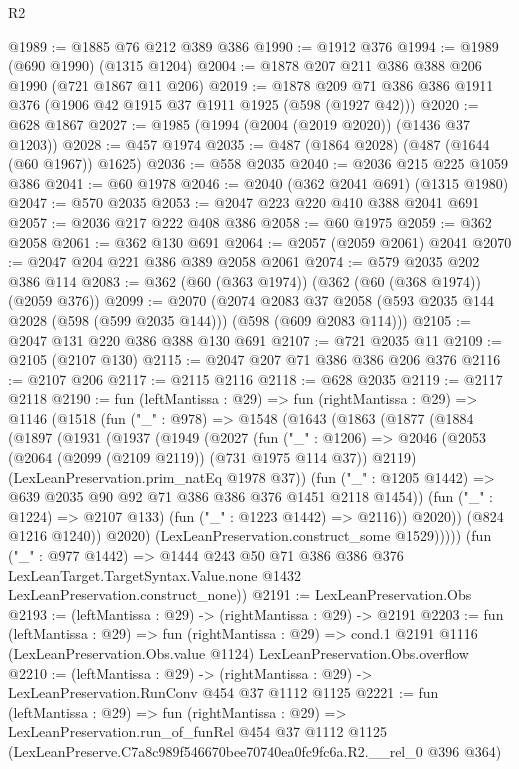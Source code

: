 \begin{lexlean}{R2}
\begin{coremodule}
@1989 := @1885 @76 @212 @389 @386
@1990 := @1912 @376
@1994 := @1989 (@690 @1990) (@1315 @1204)
@2004 := @1878 @207 @211 @386 @388 @206 @1990 (@721 @1867 @11 @206)
@2019 := @1878 @209 @71 @386 @386 @1911 @376 (@1906 @42 @1915 @37 @1911 @1925 (@598 (@1927 @42)))
@2020 := @628 @1867
@2027 := @1985 (@1994 (@2004 (@2019 @2020)) (@1436 @37 @1203))
@2028 := @457 @1974
@2035 := @487 (@1864 @2028) (@487 (@1644 (@60 @1967)) @1625)
@2036 := @558 @2035
@2040 := @2036 @215 @225 @1059 @386
@2041 := @60 @1978
@2046 := @2040 (@362 @2041 @691) (@1315 @1980)
@2047 := @570 @2035
@2053 := @2047 @223 @220 @410 @388 @2041 @691
@2057 := @2036 @217 @222 @408 @386
@2058 := @60 @1975
@2059 := @362 @2058
@2061 := @362 @130 @691
@2064 := @2057 (@2059 @2061) @2041
@2070 := @2047 @204 @221 @386 @389 @2058 @2061
@2074 := @579 @2035 @202 @386 @114
@2083 := @362 (@60 (@363 @1974)) (@362 (@60 (@368 @1974)) (@2059 @376))
@2099 := @2070
    (@2074
      @2083
      @37
      @2058
      (@593 @2035 @144 @2028 (@598 (@599 @2035 @144)))
      (@598 (@609 @2083 @114)))
@2105 := @2047 @131 @220 @386 @388 @130 @691
@2107 := @721 @2035 @11
@2109 := @2105 (@2107 @130)
@2115 := @2047 @207 @71 @386 @386 @206 @376
@2116 := @2107 @206
@2117 := @2115 @2116
@2118 := @628 @2035
@2119 := @2117 @2118
@2190 := fun (leftMantissa : @29) =>
  fun (rightMantissa : @29) =>
  @1146
    (@1518
      (fun ("_" : @978) =>
      @1548
        (@1643
          (@1863
            (@1877
              (@1884
                (@1897
                  (@1931
                    (@1937
                      (@1949
                        (@2027
                          (fun ("_" : @1206) =>
                          @2046
                            (@2053 (@2064 (@2099 (@2109 @2119)) (@731 @1975 @114 @37)) @2119)
                            (LexLeanPreservation.prim_natEq @1978 @37))
                          (fun ("_" : @1205 @1442) =>
                          @639 @2035 @90 @92 @71 @386 @386 @376 @1451 @2118 @1454))
                        (fun ("_" : @1224) => @2107 @133)
                        (fun ("_" : @1223 @1442) => @2116))
                      @2020))
                  (@824 @1216 @1240))
                @2020)
              (LexLeanPreservation.construct_some @1529)))))
      (fun ("_" : @977 @1442) =>
      @1444
        @243
        @50
        @71
        @386
        @386
        @376
        LexLeanTarget.TargetSyntax.Value.none
        @1432
        LexLeanPreservation.construct_none))
@2191 := LexLeanPreservation.Obs
@2193 := (leftMantissa : @29) -> (rightMantissa : @29) -> @2191
@2203 := fun (leftMantissa : @29) =>
  fun (rightMantissa : @29) =>
  cond.{1} @2191 @1116 (LexLeanPreservation.Obs.value @1124) LexLeanPreservation.Obs.overflow
@2210 := (leftMantissa : @29) ->
  (rightMantissa : @29) -> LexLeanPreservation.RunConv @454 @37 @1112 @1125
@2221 := fun (leftMantissa : @29) =>
  fun (rightMantissa : @29) =>
  LexLeanPreservation.run_of_funRel
    @454
    @37
    @1112
    @1125
    (LexLeanPreserve.C7a8c989f546670bee70740ea0fc9fc6a.R2.__rel_0 @396 @364)
\end{coremodule}
\end{lexlean}

